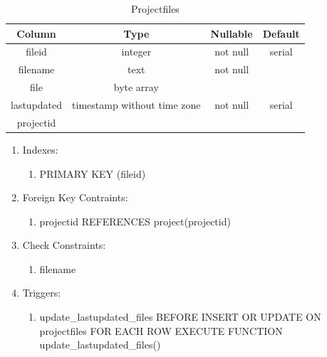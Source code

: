\documentclass[conference]{IEEEtran}
\begin{document}
\begin{table}[htbp]
  \caption{Projectfiles}
  \begin{center}
    \begin{tabular}{|c|c|c|c|}
      \hline
      \textbf{Column} & \textbf{Type} & \textbf{Nullable} & \textbf{Default}\\
      \hline
      fileid & integer & not null & serial\\
      filename & text & not null &\\
      file & byte array &&\\
      lastupdated & timestamp without time zone & not null & serial\\
      projectid &&&\\
      \hline
    \end{tabular}
    \begin{enumerate}
    \item Indexes:
      \begin{enumerate}
      \item PRIMARY KEY (fileid)
      \end{enumerate}
    \item Foreign Key Contraints:
      \begin{enumerate}
        \item projectid REFERENCES project(projectid)
      \end{enumerate}
    \item Check Constraints:
      \begin{enumerate}
      \item filename
      \end{enumerate}
    \item Triggers:
      \begin{enumerate}
        \item update\_lastupdated\_files BEFORE INSERT OR UPDATE ON projectfiles FOR EACH ROW EXECUTE FUNCTION update\_lastupdated\_files()
      \end{enumerate}
    \end{enumerate}
    \label{projectfiles}
  \end{center}
\end{table}
\end{document}
